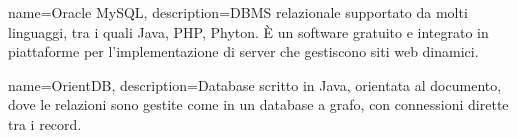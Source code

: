 {
	name=Oracle MySQL,
	description={DBMS relazionale supportato da molti linguaggi, tra i quali Java, PHP, Phyton. \MakeUppercase{è} un software gratuito e integrato in piattaforme per l'implementazione di server che gestiscono siti web dinamici.}
}

{
	name=OrientDB,
	description={Database scritto in Java, orientata al documento, dove le relazioni sono gestite come in un database a grafo, con connessioni dirette tra i record.}
}

